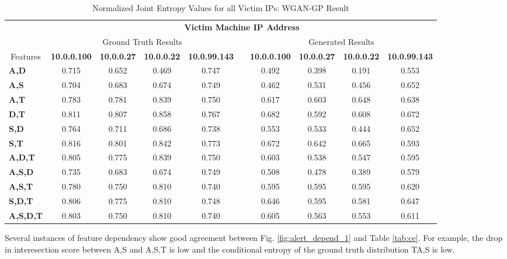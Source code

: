 \begin{table}[!htbp]
	\caption{Normalized Joint Entropy Values for all Victim IPs: WGAN-GP Result}
	\label{tab:je}
	\centering
	\begin{adjustbox}{angle=90}
		\begin{tabular}{l|c|c|c|c|c|c|c|c|c|}
			\multicolumn{1}{c|}{} & \multicolumn{9}{c|}{\textbf{Victim Machine IP Address}} \\
			\multicolumn{1}{c|}{} & \multicolumn{4}{c|}{Ground Truth Results} &  & \multicolumn{4}{c|}{Generated Results} \\
			\multicolumn{1}{c|}{Features} & \textbf{10.0.0.100} & \textbf{10.0.0.27} & \textbf{10.0.0.22} & \textbf{10.0.99.143} &  & \textbf{10.0.0.100} & \textbf{10.0.0.27} & \textbf{10.0.0.22} & \textbf{10.0.99.143} \\ \hline
			\textbf{A,D} & 0.715 & 0.652 & 0.469 & 0.747 &  & 0.492 & 0.398 & 0.191 & 0.553 \\
			\textbf{A,S} & 0.704 & 0.683 & 0.674 & 0.749 &  & 0.462 & 0.531 & 0.456 & 0.652 \\
			\textbf{A,T} & 0.783 & 0.781 & 0.839 & 0.750 &  & 0.617 & 0.603 & 0.648 & 0.638 \\
			\textbf{D,T} & 0.811 & 0.807 & 0.858 & 0.767 &  & 0.682 & 0.592 & 0.608 & 0.672 \\
			\textbf{S,D} & 0.764 & 0.711 & 0.686 & 0.738 &  & 0.553 & 0.533 & 0.444 & 0.652 \\
			\textbf{S,T} & 0.816 & 0.801 & 0.842 & 0.773 &  & 0.672 & 0.642 & 0.665 & 0.593 \\ \hline
			\textbf{A,D,T} & 0.805 & 0.775 & 0.839 & 0.750 &  & 0.603 & 0.538 & 0.547 & 0.595 \\
			\textbf{A,S,D} & 0.735 & 0.683 & 0.674 & 0.749 &  & 0.508 & 0.478 & 0.389 & 0.579 \\
			\textbf{A,S,T} & 0.780 & 0.750 & 0.810 & 0.740 &  & 0.595 & 0.595 & 0.595 & 0.620 \\
			\textbf{S,D,T} & 0.806 & 0.775 & 0.810 & 0.748 &  & 0.646 & 0.595 & 0.581 & 0.647 \\ \hline
			\textbf{A,S,D,T} & 0.803 & 0.750 & 0.810 & 0.740 &  & 0.605 & 0.563 & 0.553 & 0.611
			\end{tabular}
	\end{adjustbox}
\end{table}

Several instances of feature dependency show good agreement between Fig. \ref{fig:alert_depend_1} and Table \ref{tab:ce}. For example, the drop in interesection score between A,S and A,S,T is low and the conditional entropy of the ground truth distribution T{\given}A,S is low. 


